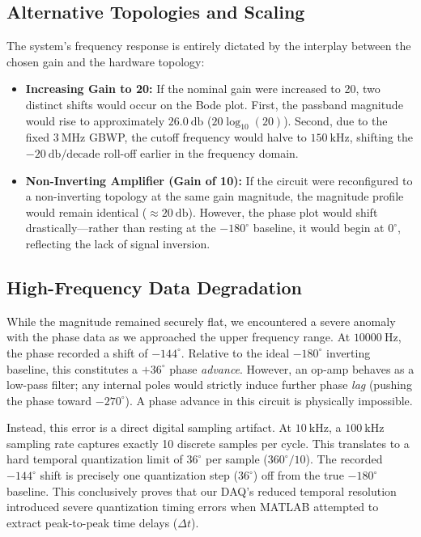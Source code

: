 \documentclass[11pt]{article}
\begin{document}
\subsection{Alternative Topologies and Scaling}
The system's frequency response is entirely dictated by the interplay between the chosen gain and the hardware topology:
\begin{itemize}
  \item \textbf{Increasing Gain to 20:} If the nominal gain were increased to 20, two distinct shifts would occur on the Bode plot. First, the passband magnitude would rise to approximately $\SI{26.0}{\decibel}$ ($20\log_{10}(20)$). Second, due to the fixed $\SI{3}{\mega\hertz}$ GBWP, the cutoff frequency would halve to $\SI{150}{\kilo\hertz}$, shifting the $\SI{-20}{\decibel}\text{/decade}$ roll-off earlier in the frequency domain.
  \item \textbf{Non-Inverting Amplifier (Gain of 10):} If the circuit were reconfigured to a non-inverting topology at the same gain magnitude, the magnitude profile would remain identical ($\approx \SI{20}{\decibel}$). However, the phase plot would shift drastically—rather than resting at the $-180^\circ$ baseline, it would begin at $0^\circ$, reflecting the lack of signal inversion.
\end{itemize}

\subsection{High-Frequency Data Degradation}
While the magnitude remained securely flat, we encountered a severe anomaly with the phase data as we approached the upper frequency range. At $\SI{10000}{\hertz}$, the phase recorded a shift of $-144^\circ$. Relative to the ideal $-180^\circ$ inverting baseline, this constitutes a $+36^\circ$ phase \textit{advance}. However, an op-amp behaves as a low-pass filter; any internal poles would strictly induce further phase \textit{lag} (pushing the phase toward $-270^\circ$). A phase advance in this circuit is physically impossible.

Instead, this error is a direct digital sampling artifact. At $\SI{10}{\kilo\hertz}$, a $\SI{100}{\kilo\hertz}$ sampling rate captures exactly 10 discrete samples per cycle. This translates to a hard temporal quantization limit of $36^\circ$ per sample ($360^\circ / 10$). The recorded $-144^\circ$ shift is precisely one quantization step ($36^\circ$) off from the true $-180^\circ$ baseline. This conclusively proves that our DAQ's reduced temporal resolution introduced severe quantization timing errors when MATLAB attempted to extract peak-to-peak time delays ($\Delta t$).
\end{document}
